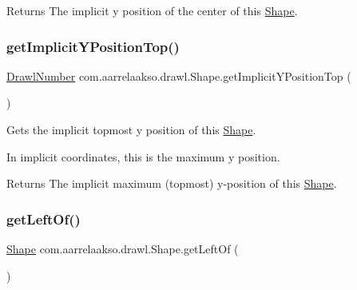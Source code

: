 \begin{DoxyReturn}{Returns}
The implicit y position of the center of this \hyperlink{classcom_1_1aarrelaakso_1_1drawl_1_1_shape}{Shape}. 
\end{DoxyReturn}
\mbox{\label{classcom_1_1aarrelaakso_1_1drawl_1_1_shape_afb64d51ac2023ad770bbc8f37061d5b0}} 
\subsubsection{\texorpdfstring{get\+Implicit\+Y\+Position\+Top()}{getImplicitYPositionTop()}}
{\footnotesize\ttfamily \hyperlink{classcom_1_1aarrelaakso_1_1drawl_1_1_drawl_number}{Drawl\+Number} com.\+aarrelaakso.\+drawl.\+Shape.\+get\+Implicit\+Y\+Position\+Top (\begin{DoxyParamCaption}{ }\end{DoxyParamCaption})\hspace{0.3cm}{\ttfamily [protected]}}



Gets the implicit topmost y position of this \hyperlink{classcom_1_1aarrelaakso_1_1drawl_1_1_shape}{Shape}. 

In implicit coordinates, this is the maximum y position.

\begin{DoxyReturn}{Returns}
The implicit maximum (topmost) y-\/position of this \hyperlink{classcom_1_1aarrelaakso_1_1drawl_1_1_shape}{Shape}. 
\end{DoxyReturn}
\mbox{\label{classcom_1_1aarrelaakso_1_1drawl_1_1_shape_a2b19d5964ac46d545a7bae3133df6532}} 
\subsubsection{\texorpdfstring{get\+Left\+Of()}{getLeftOf()}}
{\footnotesize\ttfamily \hyperlink{classcom_1_1aarrelaakso_1_1drawl_1_1_shape}{Shape} com.\+aarrelaakso.\+drawl.\+Shape.\+get\+Left\+Of (\begin{DoxyParamCaption}{ }\end{DoxyParamCaption})}



